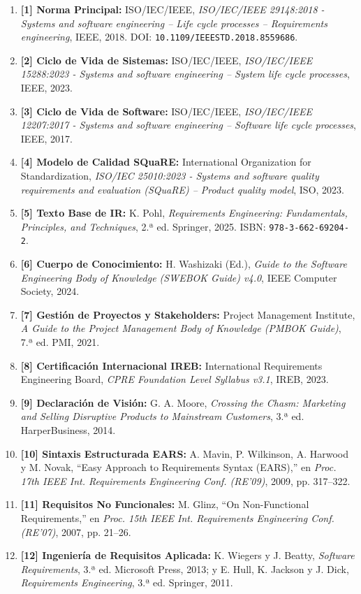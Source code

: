 \begin{enumerate}
	\item \textbf{[1] Norma Principal:} ISO/IEC/IEEE, \textit{ISO/IEC/IEEE 29148:2018 - Systems and software engineering -- Life cycle processes -- Requirements engineering}, IEEE, 2018. DOI: \texttt{10.1109/IEEESTD.2018.8559686}.
	\item \textbf{[2] Ciclo de Vida de Sistemas:} ISO/IEC/IEEE, \textit{ISO/IEC/IEEE 15288:2023 - Systems and software engineering -- System life cycle processes}, IEEE, 2023.
	\item \textbf{[3] Ciclo de Vida de Software:} ISO/IEC/IEEE, \textit{ISO/IEC/IEEE 12207:2017 - Systems and software engineering -- Software life cycle processes}, IEEE, 2017.
	\item \textbf{[4] Modelo de Calidad SQuaRE:} International Organization for Standardization, \textit{ISO/IEC 25010:2023 - Systems and software quality requirements and evaluation (SQuaRE) -- Product quality model}, ISO, 2023.
	\item \textbf{[5] Texto Base de IR:} K. Pohl, \textit{Requirements Engineering: Fundamentals, Principles, and Techniques}, 2.ª ed. Springer, 2025. ISBN: \texttt{978-3-662-69204-2}.
	\item \textbf{[6] Cuerpo de Conocimiento:} H. Washizaki (Ed.), \textit{Guide to the Software Engineering Body of Knowledge (SWEBOK Guide) v4.0}, IEEE Computer Society, 2024.
	\item \textbf{[7] Gestión de Proyectos y Stakeholders:} Project Management Institute, \textit{A Guide to the Project Management Body of Knowledge (PMBOK Guide)}, 7.ª ed. PMI, 2021.
	\item \textbf{[8] Certificación Internacional IREB:} International Requirements Engineering Board, \textit{CPRE Foundation Level Syllabus v3.1}, IREB, 2023.
	\item \textbf{[9] Declaración de Visión:} G. A. Moore, \textit{Crossing the Chasm: Marketing and Selling Disruptive Products to Mainstream Customers}, 3.ª ed. HarperBusiness, 2014.
	\item \textbf{[10] Sintaxis Estructurada EARS:} A. Mavin, P. Wilkinson, A. Harwood y M. Novak, ``Easy Approach to Requirements Syntax (EARS),'' en \textit{Proc. 17th IEEE Int. Requirements Engineering Conf. (RE'09)}, 2009, pp. 317--322.
	\item \textbf{[11] Requisitos No Funcionales:} M. Glinz, ``On Non-Functional Requirements,'' en \textit{Proc. 15th IEEE Int. Requirements Engineering Conf. (RE'07)}, 2007, pp. 21--26.
	\item \textbf{[12] Ingeniería de Requisitos Aplicada:} K. Wiegers y J. Beatty, \textit{Software Requirements}, 3.ª ed. Microsoft Press, 2013; y E. Hull, K. Jackson y J. Dick, \textit{Requirements Engineering}, 3.ª ed. Springer, 2011.
\end{enumerate}
